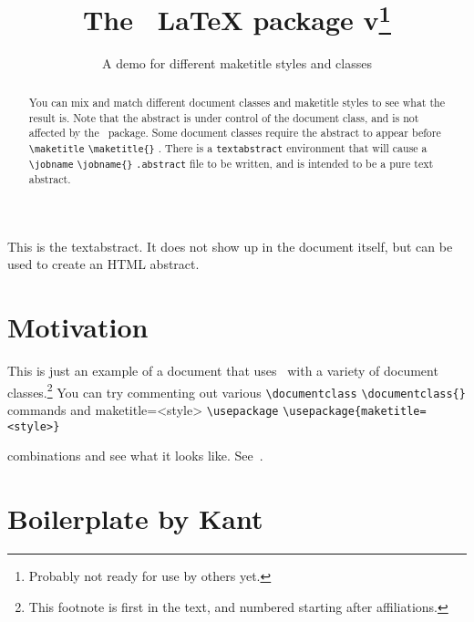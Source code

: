 \documentclass{scrarticle}
\title[plaintext={The metacapture LaTeX package},
       running={The \pkgname\ \LaTeX\ package v\pkgversion},
      ]{The \pkgname\ \textrm{\LaTeX} package v\pkgversion\footnote{Probably not ready for use by others yet.}}
\subtitle{A demo for different maketitle styles and classes}
\newcommand{\acmd}[2][]{%
  \def\FirstArg{#1}%
  \ifx\FirstArg\empty%
    \texttt{\textbackslash{}#2}%
  \else%
    \texttt{\textbackslash{}#2\{#1\}}%
  \fi
}
\begin{document}
\hypersetup{colorlinks=true}
\maketitle
\begin{abstract}

You can mix and match different document classes and maketitle styles to see what the result
is. Note that the abstract is under control of the document class, and is not affected
by the \pkgname\ package. Some document classes require the abstract to appear before
\acmd{maketitle}. There is a \texttt{textabstract} environment
that will cause a \acmd{jobname}\texttt{.abstract} file to be written, and is
intended to be a pure text abstract.
\end{abstract}
\begin{textabstract}
  This is the textabstract. It does not show up in the document itself, but can
  be used to create an HTML abstract.
\end{textabstract}

\section{Motivation}
This is just an example of a document that uses \pkgname\ with a variety of document
classes.\footnote{This footnote is first in the text, and numbered starting after affiliations.}
You can try commenting out various
\acmd{documentclass} commands and \acmd[maketitle=\textless{style}\textgreater]{usepackage}
combinations and see what it looks like. See~\cite{tugboat,falsehoods}.
  
\section{Boilerplate by Kant}
\kant[1-4]

\end{document}
